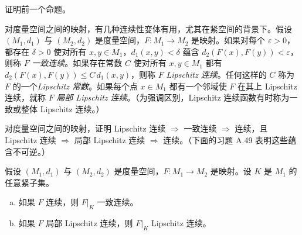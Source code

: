 \documentclass[../../main.tex]{subfiles}
\begin{document}
\begin{exercise}\label{exercise:appA-A-46}
证明前一个命题。
\end{exercise}

对度量空间之间的映射，有几种连续性变体有用，尤其在紧空间的背景下。假设 $(M_1,d_1)$ 与 $(M_2,d_2)$ 是度量空间，$F:M_1\to M_2$ 是映射。如果对每个 $\varepsilon>0$，都存在 $\delta>0$ 使对所有 $x,y\in M_1$，$d_1(x,y)<\delta$ 蕴含 $d_2(F(x),F(y))<\varepsilon$，则称 $F$ \emph{一致连续}。如果存在常数 $C$ 使对所有 $x,y\in M_1$ 都有 $d_2(F(x),F(y))\leqslant C\,d_1(x,y)$，则称 $F$ \emph{Lipschitz 连续}。任何这样的 $C$ 称为 $F$ 的一个\emph{Lipschitz 常数}。如果每个点 $x\in M_1$ 都有一个邻域使 $F$ 在其上 Lipschitz 连续，就称 $F$ \emph{局部 Lipschitz 连续}。（为强调区别，Lipschitz 连续函数有时称为一致或整体 Lipschitz 连续。）

\begin{exercise}\label{exercise:appA-A-47}
对度量空间之间的映射，证明 Lipschitz 连续 $\Rightarrow$ 一致连续 $\Rightarrow$ 连续，且 Lipschitz 连续 $\Rightarrow$ 局部 Lipschitz 连续 $\Rightarrow$ 连续。（下面的习题 A.49 表明这些蕴含不可逆。）
\end{exercise}

\begin{proposition}\label{proposition:appA-compact-continuity}
假设 $(M_1,d_1)$ 与 $(M_2,d_2)$ 是度量空间，$F:M_1\to M_2$ 是映射。设 $K$ 是 $M_1$ 的任意紧子集。
\begin{enumerate}[(a)]
\item 如果 $F$ 连续，则 $F|_K$ 一致连续。
\item 如果 $F$ 局部 Lipschitz 连续，则 $F|_K$ Lipschitz 连续。
\end{enumerate}
\end{proposition}
\end{document}
